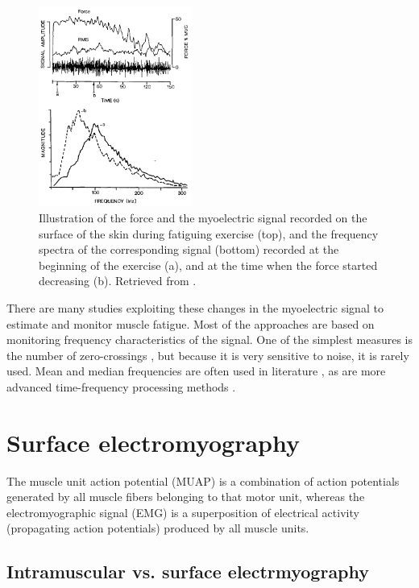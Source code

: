 \begin{figure}[ht]
\centering
\includegraphics[width=0.45\textwidth]{Images/introduction/fatigue.png}
\caption{Illustration of the force and the myoelectric signal recorded on the surface of the skin during fatiguing exercise (top), and the frequency spectra of the corresponding signal (bottom) recorded at the beginning of the exercise (a), and at the time when the force started decreasing (b). Retrieved from \citet{DeLuca1984}.}
\label{fig:fatigue}
\end{figure}

There are many studies exploiting these changes in the myoelectric signal to estimate and monitor muscle fatigue. Most of the approaches are based on monitoring frequency characteristics of the signal. One of the simplest measures is the number of zero-crossings \citep{Hagg1981}, but because it is very sensitive to noise, it is rarely used. Mean and median frequencies are often used in literature \citep{Lindstrom1977, Merletti1997, Stulen1981}, as are more advanced time-frequency processing methods \citep{Knaflitz1999, Cifrek2000, Georgakis2003, Srhoj-Egekher2011a}.


\section{Surface electromyography}

The muscle unit action potential (MUAP) is a combination of action potentials generated by all muscle fibers belonging to that motor unit, whereas the electromyographic signal (EMG) is a superposition of electrical activity (propagating action potentials) produced by all muscle units. 

\subsection{Intramuscular vs. surface electrmyography}

